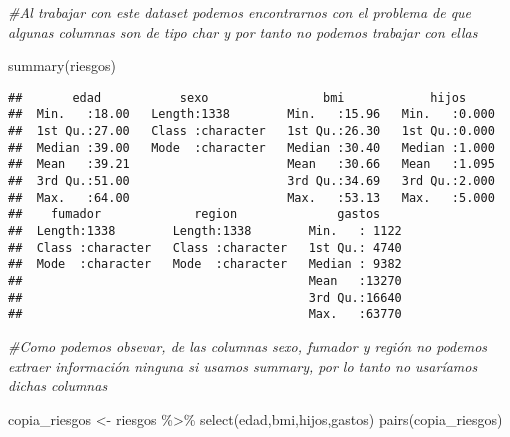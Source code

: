 \documentclass[
]{book}
\newenvironment{Shaded}{\begin{snugshade}}{\end{snugshade}}
\newcommand{\CommentTok}[1]{\textcolor[rgb]{0.56,0.35,0.01}{\textit{#1}}}
\newcommand{\FunctionTok}[1]{\textcolor[rgb]{0.00,0.00,0.00}{#1}}
\newcommand{\NormalTok}[1]{#1}
\newcommand{\OtherTok}[1]{\textcolor[rgb]{0.56,0.35,0.01}{#1}}
\newcommand{\SpecialCharTok}[1]{\textcolor[rgb]{0.00,0.00,0.00}{#1}}
\begin{document}
\begin{Shaded}
\begin{Highlighting}[]
\CommentTok{\#Al trabajar con este dataset podemos encontrarnos con el problema de que algunas columnas son de tipo char y por tanto no podemos trabajar con ellas}
\end{Highlighting}
\end{Shaded}

\begin{Shaded}
\begin{Highlighting}[]
\FunctionTok{summary}\NormalTok{(riesgos)}
\end{Highlighting}
\end{Shaded}

\begin{verbatim}
##       edad           sexo                bmi            hijos      
##  Min.   :18.00   Length:1338        Min.   :15.96   Min.   :0.000  
##  1st Qu.:27.00   Class :character   1st Qu.:26.30   1st Qu.:0.000  
##  Median :39.00   Mode  :character   Median :30.40   Median :1.000  
##  Mean   :39.21                      Mean   :30.66   Mean   :1.095  
##  3rd Qu.:51.00                      3rd Qu.:34.69   3rd Qu.:2.000  
##  Max.   :64.00                      Max.   :53.13   Max.   :5.000  
##    fumador             region              gastos     
##  Length:1338        Length:1338        Min.   : 1122  
##  Class :character   Class :character   1st Qu.: 4740  
##  Mode  :character   Mode  :character   Median : 9382  
##                                        Mean   :13270  
##                                        3rd Qu.:16640  
##                                        Max.   :63770
\end{verbatim}

\begin{Shaded}
\begin{Highlighting}[]
\CommentTok{\#Como podemos obsevar, de las columnas sexo, fumador y región no podemos extraer información ninguna si usamos summary, por lo tanto no usaríamos dichas columnas}
\end{Highlighting}
\end{Shaded}

\begin{Shaded}
\begin{Highlighting}[]
\NormalTok{copia\_riesgos }\OtherTok{\textless{}{-}}\NormalTok{ riesgos }\SpecialCharTok{\%\textgreater{}\%} \FunctionTok{select}\NormalTok{(edad,bmi,hijos,gastos)}
\FunctionTok{pairs}\NormalTok{(copia\_riesgos)}
\end{Highlighting}
\end{Shaded}
\end{document}
